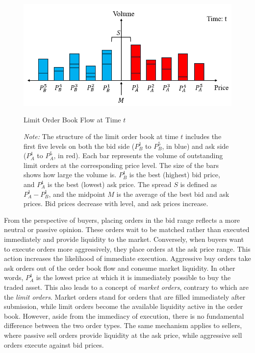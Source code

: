 \begin{figure}[htbp]
    \centering
    \includegraphics[width=0.8\linewidth]{figures/order_book_t.png}
    \caption{Limit Order Book Flow at Time $t$} 
    \caption*{\textit{Note:} The structure of the limit order book at time $t$ includes the first five levels on both the bid side ($P_B^1$ to $P_B^5$, in blue) and ask side ($P_A^1$ to $P_A^5$, in red). Each bar represents the volume of outstanding limit orders at the corresponding price level. The size of the bars shows how large the volume is. $P_B^1$ is the best (highest) bid price, and $P_A^1$ is the best (lowest) ask price. The spread $S$ is defined as $P_A^1 - P_B^1$, and the midpoint $M$ is the average of the best bid and ask prices. Bid prices decrease with level, and ask prices increase. }
    \label{fig: order_book_t}
\end{figure}

From the perspective of buyers, placing orders in the bid range reflects a more neutral or passive opinion. These orders wait to be matched rather than executed immediately and provide liquidity to the market. Conversely, when buyers want to execute orders more aggressively, they place orders at the ask price range. This action increases the likelihood of immediate execution. Aggressive buy orders take ask orders out of the order book flow and consume market liquidity. In other words, $P_A ^ {1}$ is the lowest price at which it is immediately possible to buy the traded asset. This also leads to a concept of \textit{market orders}, contrary to which are the \textit{limit orders}. Market orders stand for orders that are filled immediately after submission, while limit orders become the available liquidity active in the order book. However, aside from the immediacy of execution, there is no fundamental difference between the two order types. The same mechanism applies to sellers, where passive sell orders provide liquidity at the ask price, while aggressive sell orders execute against bid prices.

